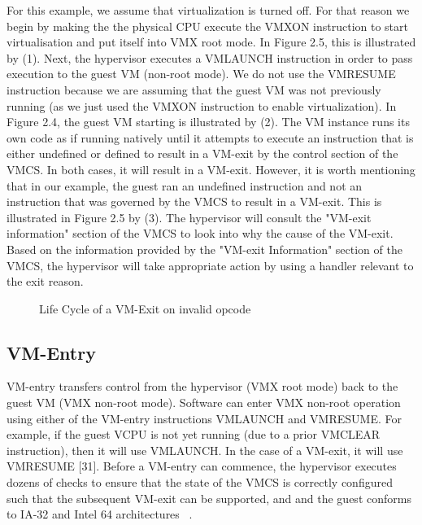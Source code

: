 \documentclass{report}
\begin{document}
\begin{spacing}{1.5}
{\large
For this example, we assume that virtualization is turned off. For that reason we begin by making the the physical CPU execute the VMXON instruction to start virtualisation and put itself into VMX root mode. In Figure 2.5, this is illustrated by (1). Next, the hypervisor executes a VMLAUNCH instruction in order to pass execution to the guest VM (non-root mode). We do not use the VMRESUME instruction because we are assuming that the guest VM was not previously running (as we just used the VMXON instruction to enable virtualization). In Figure 2.4, the guest VM starting is illustrated by (2). The VM instance runs its own code as if running natively until it attempts to execute an instruction that is either undefined or defined to result in a VM-exit by the control section of the VMCS. In both cases, it will result in a VM-exit. However, it is worth mentioning that in our example, the guest ran an undefined instruction and not an instruction that was governed by the VMCS to result in a VM-exit. This is illustrated in Figure 2.5 by (3). The hypervisor will consult the "VM-exit information" section of the VMCS to look into why the cause of the VM-exit. Based on the information provided by the "VM-exit Information" section of the VMCS, the hypervisor will take appropriate action by using a handler relevant to the exit reason.
\newline
}




\vfill
{}
\begin{figure}[ht]
    \centering
    \caption{Life Cycle of a VM-Exit on invalid opcode}
\end{figure}



\subsection{VM-Entry}
{\large
VM-entry transfers control from the hypervisor (VMX root mode) back to the guest VM (VMX non-root mode). Software can enter VMX non-root operation using either of the VM-entry instructions VMLAUNCH and VMRESUME. For example, if the guest VCPU is not yet running (due to a prior VMCLEAR instruction), then it will use VMLAUNCH. In the case of a VM-exit, it will use VMRESUME [31]. Before a VM-entry can commence, the hypervisor executes dozens of checks to ensure that the state of the VMCS is correctly configured such that the subsequent VM-exit can be supported, and and the guest conforms to IA-32 and Intel 64 architectures ~\cite{goto2011kernel}.
\newline
}


\end{spacing}
\end{document}
